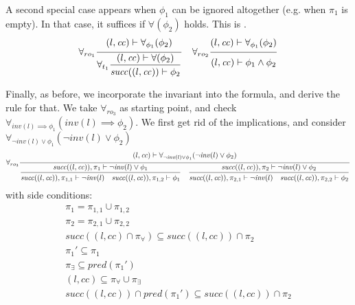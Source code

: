 \documentclass{article}
\newcommand{\proofrule}[3][]{#1 \frac{\raisebox{.7ex}{\normalsize{$#2$}}}
  {\raisebox{-1.0ex}{\normalsize{$#3$}}}}
\newcommand{\placeholder}[1][]{\pi_{#1}}
\newcommand{\loc}{l}
\newcommand{\region}{\mathit{cc}}
\newcommand{\suc}{\mathit{succ}}
\newcommand{\pre}{\mathit{pred}}
\newcommand{\inv}{\mathit{inv}}
\begin{document}
A second special case appears when $\phi_1$ can be ignored altogether (e.g. when $\placeholder[1]$ is empty). In that case, it suffices if $\forall(\phi_2)$ holds. This is \cite[proof rule $\forall_{ro_1}$]{FC:14report}.
\[
\proofrule[\forall_{ro_1}]
{(\loc, \region) \vdash \forall_{\phi_1}(\phi_2)}
{ \proofrule[\forall_{t_1}]
  {(\loc, \region) \vdash \forall(\phi_2)}
  {\suc((\loc, \region)) \vdash \phi_2}
}
\quad
\proofrule[\forall_{ro_2}]
{(\loc, \region) \vdash \forall_{\phi_1}(\phi_2)}
{(\loc, \region) \vdash \phi_1 \land \phi_2}
\]

Finally, as before, we incorporate the invariant into the formula, and derive the rule for that.
We take $\forall_{ro_3}$ as starting point, and check $\forall_{\inv(\loc) \implies \phi_1}(\inv(\loc) \implies \phi_2)$. We first get rid of the implications, and consider $\forall_{\lnot \inv(\loc) \lor \phi_1}(\lnot \inv(\loc) \lor \phi_2)$
\[
\proofrule[\forall_{ro_3}]
{(\loc, \region) \vdash \forall_{\lnot \inv(\loc) \lor \phi_1}(\lnot \inv(\loc) \lor \phi_2)}
{ \proofrule
  {\suc((\loc, \region)), \placeholder[1] \vdash \lnot \inv(\loc) \lor \phi_1}
  {\suc((\loc, \region)), \placeholder[1,1] \vdash \lnot \inv(\loc)
   \quad \suc((\loc, \region)), \placeholder[1,2] \vdash \phi_1}
  \quad 
  \proofrule
  {\suc((\loc, \region)), \placeholder[2] \vdash \lnot \inv(\loc) \lor \phi_2}
  {\suc((\loc, \region)), \placeholder[2,1] \vdash \lnot \inv(\loc)
  \quad \suc((\loc, \region)), \placeholder[2,2] \vdash \phi_2}
}
\]
with side conditions:
\[
\begin{array}{l}
\placeholder[1] = \placeholder[1,1] \cup \placeholder[1,2]\\
\placeholder[2] = \placeholder[2,1] \cup \placeholder[2,2]\\
\suc((\loc, \region) \cap \placeholder[\forall]) \subseteq \suc((\loc, \region)) \cap \placeholder[2]\\
\placeholder[1]' \subseteq \placeholder[1]\\
\placeholder[\exists] \subseteq \pre(\placeholder[1]')\\
(\loc, \region) \subseteq \placeholder[\forall] \cup \placeholder[\exists]\\
\suc((\loc, \region)) \cap \pre(\placeholder[1]') \subseteq \suc((\loc, \region)) \cap \placeholder[2]
\end{array}
\]
\end{document}
